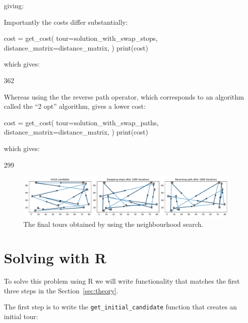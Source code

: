 giving:

\begin{pyout}
[0, 8, 5, 3, 1, 9, 12, 11, 4, 10, 6, 2, 7, 0]
\end{pyout}

Importantly the costs differ substantially:

\begin{pyin}
cost = get_cost(
    tour=solution_with_swap_stops,
    distance_matrix=distance_matrix,
)
print(cost)
\end{pyin}

which gives:

\begin{pyout}
362
\end{pyout}

Whereas using the the reverse path operator, which corresponds to an algorithm
called the ``2 opt'' algorithm, gives a lower cost:

\begin{pyin}
cost = get_cost(
    tour=solution_with_swap_paths,
    distance_matrix=distance_matrix,
)
print(cost)
\end{pyin}

which gives:

\begin{pyout}
299
\end{pyout}

\begin{figure}
    \begin{center}
        \includegraphics[width=\textwidth]{./assets/final-tsp-tours/main.pdf}
    \end{center}
    \caption{The final tours obtained by using the neighbourhood search.}
    \label{fig:final-tsp-tours}
\end{figure}

\section{Solving with R}\label{sec:solving-with-R}

To solve this problem using R we will write functionality that matches the
first three steps in the Section~\ref{sec:theory}.

The first step is to write the \texttt{get_initial_candidate}
function that creates an initial tour:

